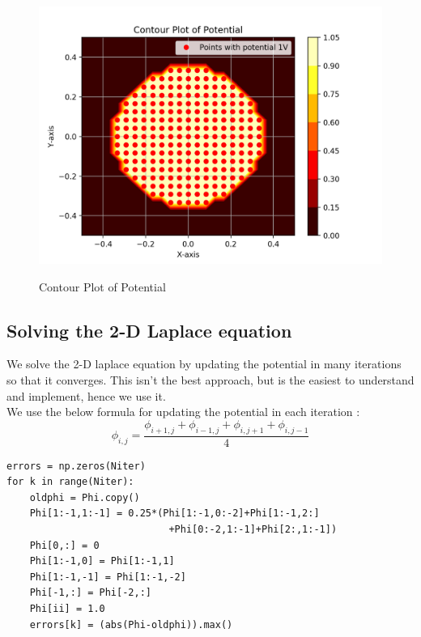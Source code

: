 \documentclass[11pt, a4paper]{article}
\begin{document}
\begin{figure}[H]
   	\centering
   	\includegraphics[scale=0.5]{cont_potl_i.png}
   	\label{fig:cont_potl_i}
   	\caption{Contour Plot of Potential}
\end{figure}

\subsection{Solving the 2-D Laplace equation}
We solve the 2-D laplace equation by updating the potential in many iterations so that it converges. This isn't the best approach, but is the easiest to understand and implement, hence we use it.
\\We use the below formula for updating the potential in each iteration : 
\begin{equation} \label{eq:3}
\phi_{i,j} = \frac{\phi_{i+1,j} + \phi_{i-1,j} + \phi_{i,j+1} + \phi_{i,j-1}}{4}
\end{equation}
\begin{verbatim}
errors = np.zeros(Niter)
for k in range(Niter):
	oldphi = Phi.copy()
	Phi[1:-1,1:-1] = 0.25*(Phi[1:-1,0:-2]+Phi[1:-1,2:]
							+Phi[0:-2,1:-1]+Phi[2:,1:-1])
	Phi[0,:] = 0
	Phi[1:-1,0] = Phi[1:-1,1]
	Phi[1:-1,-1] = Phi[1:-1,-2]
	Phi[-1,:] = Phi[-2,:]
	Phi[ii] = 1.0
	errors[k] = (abs(Phi-oldphi)).max()
\end{verbatim}
\end{document}
